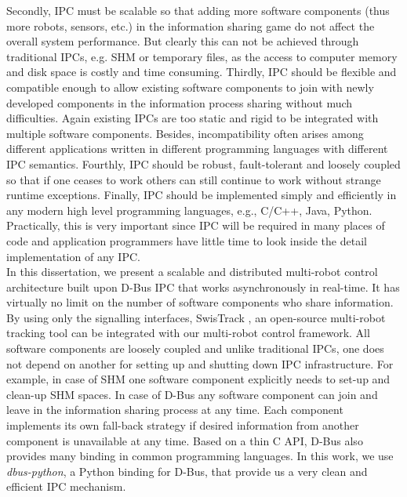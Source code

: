 Secondly, IPC must be scalable so that adding more software components (thus more robots, sensors, etc.) in the information sharing game do not affect the overall system performance. But clearly this can not be achieved through traditional IPCs, e.g. SHM or temporary files, as the access to computer memory and disk space is costly and time consuming. Thirdly, IPC should be flexible and compatible enough to allow existing software components to join with newly developed components in the information process sharing without much difficulties. Again existing IPCs are too static and rigid to be integrated with multiple software components. Besides, incompatibility often arises among different applications written in different programming languages with different IPC semantics. Fourthly, IPC should be robust, fault-tolerant and loosely coupled so that if one ceases to work others can still continue to work without strange runtime exceptions. Finally, IPC should be implemented simply and efficiently in any modern high level programming languages, e.g., C/C++, Java, Python. Practically, this is very important since IPC will be required in many places of code and application programmers have little time to look inside the detail implementation of any IPC.\\
In this dissertation, we present a scalable and distributed multi-robot control architecture built upon D-Bus IPC that works asynchronously in real-time. It has virtually no limit on the number of software components who share information. By using only the signalling interfaces, SwisTrack \cite{Lochmatter+2008}, an open-source multi-robot tracking tool can be integrated with our multi-robot control framework. All software components are loosely coupled and unlike traditional IPCs, one does not depend on another for setting up and shutting down IPC infrastructure. For example, in case of SHM one software component explicitly needs to set-up and clean-up SHM spaces. In case of D-Bus any software component can join and leave in the information sharing process at any time. Each component implements its own fall-back strategy if desired information from another component is unavailable at any time. Based on a thin C API, D-Bus also provides many binding in common programming languages. In this work, we use {\em dbus-python}, a Python binding for D-Bus, that provide us a very clean and efficient IPC mechanism.
